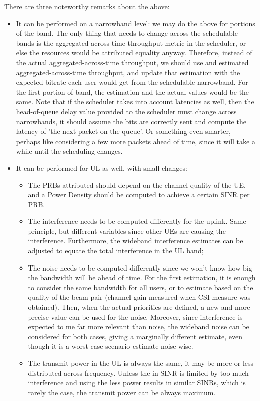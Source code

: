 There are three noteworthy remarks about the above:
\begin{itemize}
    \item It can be performed on a narrowband level: we may do the above for portions of the band. The only thing that needs to change across the schedulable bands is the aggregated-across-time throughput metric in the scheduler, or else the resources would be attributed equality anyway. Therefore, instead of the actual aggregated-across-time throughput, we should use and estimated aggregated-across-time throughput, and update that estimation with the expected bitrate each user would get from the schedulable narrowband. For the first portion of band, the estimation and the actual values would be the same. Note that if the scheduler takes into account latencies as well, then the head-of-queue delay value provided to the scheduler must change across narrowbands, it should assume the bits are correctly sent and compute the latency of 'the next packet on the queue'. Or something even smarter, perhaps like considering a few more packets ahead of time, since it will take a while until the scheduling changes.
    
    
    \item It can be performed for UL as well, with small changes:
    \begin{itemize}
        \item The \acsp{PRB} attributed should depend on the channel quality of the UE, and a Power Density should be computed to achieve a certain SINR per \acs{PRB}. 
        \item The interference needs to be computed differently for the uplink. Same principle, but different variables since other UEs are causing the interference. Furthermore, the wideband interference estimates can be adjusted to equate the total interference in the UL band;
        \item The noise needs to be computed differently since we won't know how big the bandwidth will be ahead of time. For the first estimation, it is enough to consider the same bandwidth for all users, or to estimate based on the quality of the beam-pair (channel gain measured when CSI measure was obtained). Then, when the actual priorities are defined, a new and more precise value can be used for the noise. Moreover, since interference is expected to me far more relevant than noise, the wideband noise can be considered for both cases, giving a marginally different estimate, even though it is a worst case scenario estimate noise-wise.
        \item The transmit power in the UL is always the same, it may be more or less distributed across frequency. Unless the in SINR is limited by too much interference and using the less power results in similar SINRs, which is rarely the case, the transmit power can be always maximum.
    \end{itemize}
    

\end{itemize}
